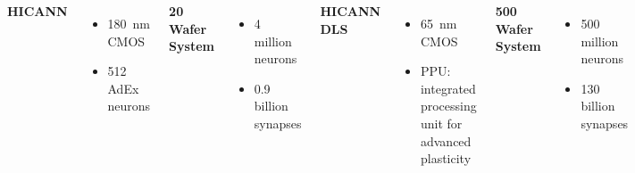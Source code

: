 \documentclass[aspectratio=169]{beamer}
\begin{document}
{\begin{frame}[fragile]
\begin{columns}[T]
		\column{0.2\paperwidth}
		\begin{center}
			\textbf{\color{mDarkTeal}HICANN}
		\end{center}
		\begin{itemize}
				\item \SI{180}{\nano\meter} CMOS
				\item 512 AdEx neurons
		\end{itemize}

		\column{0.2\paperwidth}
		\begin{center}
			\textbf{\color{mDarkTeal}20 Wafer System}
		\end{center}
		\begin{itemize}
			\item 4 million neurons
			\item 0.9 billion synapses
		\end{itemize}

		\column{0.2\paperwidth}
		\begin{center}
			\textbf{\color{mDarkTeal}HICANN DLS}
		\end{center}
		\begin{itemize}
			\item \SI{65}{\nano\meter} CMOS
			\item PPU: integrated processing unit for advanced plasticity
		\end{itemize}

		\column{0.2\paperwidth}
		\begin{center}
			\textbf{\color{mDarkTeal}500 Wafer System}
		\end{center}
		\begin{itemize}
			\item 500 million neurons
			\item 130 billion synapses
		\end{itemize}
	\end{columns}
\end{frame}
}
\end{document}
